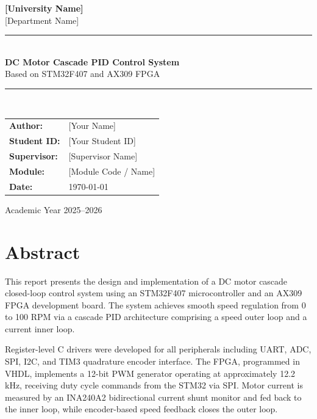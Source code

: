 \documentclass[12pt, a4paper]{report}
\begin{document}
\begin{titlepage}
    \centering
    \vspace*{2cm}

    {\Large \textbf{[University Name]}}\\[0.5cm]
    {\large [Department Name]}\\[2cm]

    \rule{\linewidth}{0.5pt}\\[0.5cm]
    {\LARGE \textbf{DC Motor Cascade PID Control System}}\\[0.3cm]
    {\large Based on STM32F407 and AX309 FPGA}\\[0.5cm]
    \rule{\linewidth}{0.5pt}\\[2cm]

    {\large
    \begin{tabular}{ll}
        \textbf{Author:}   & [Your Name] \\[0.3cm]
        \textbf{Student ID:} & [Your Student ID] \\[0.3cm]
        \textbf{Supervisor:} & [Supervisor Name] \\[0.3cm]
        \textbf{Module:}   & [Module Code / Name] \\[0.3cm]
        \textbf{Date:}     & \today \\
    \end{tabular}
    }

    \vfill
    {\small Academic Year 2025--2026}
\end{titlepage}

\chapter*{Abstract}

This report presents the design and implementation of a DC motor cascade
closed-loop control system using an STM32F407 microcontroller and an AX309
FPGA development board. The system achieves smooth speed regulation from
0 to 100 RPM via a cascade PID architecture comprising a speed outer loop
and a current inner loop.

Register-level C drivers were developed for all peripherals including UART,
ADC, SPI, I2C, and TIM3 quadrature encoder interface. The FPGA, programmed
in VHDL, implements a 12-bit PWM generator operating at approximately
12.2\,kHz, receiving duty cycle commands from the STM32 via SPI. Motor
current is measured by an INA240A2 bidirectional current shunt monitor and
fed back to the inner loop, while encoder-based speed feedback closes the
outer loop.
\end{document}
